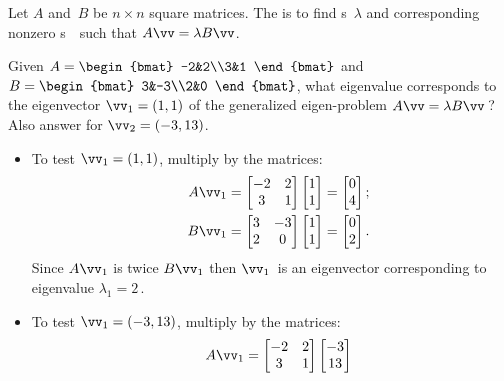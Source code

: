 \begin{reduce}
\begin{definition} \label{def:geneig}
Let \(A\) and~\(B\) be \(n\times n\) square matrices. 
The  is to find  s~\(\lambda\) and corresponding nonzero s~\vv\ such that \(A\vv=\lambda B\vv\).
\end{definition}


\begin{example} 
Given \(A=\begin{bmat} -2&2\\3&1 \end{bmat}\) and \(B=\begin{bmat} 3&-3\\2&0 \end{bmat}\), what eigenvalue corresponds to the eigenvector \(\vv_1=(1,1)\) of the generalized eigen-problem \(A\vv=\lambda B\vv\)\,?  
Also answer for \(\vv_2=(-3,13)\).
\begin{solution} 
\begin{itemize}
\item To test \(\vv_1=(1,1)\), multiply by the matrices:
\begin{eqnarray*}
&&A\vv_1=\begin{bmatrix} -2&2\\3&1 \end{bmatrix}\begin{bmatrix} 1\\1 \end{bmatrix}
=\begin{bmatrix} 0\\4 \end{bmatrix};
\\&&B\vv_1=\begin{bmatrix} 3&-3\\2&0 \end{bmatrix}\begin{bmatrix} 1\\1 \end{bmatrix}
=\begin{bmatrix} 0\\2 \end{bmatrix}.
\end{eqnarray*}
Since \(A\vv_1\) is twice \(B\vv_1\) then \(\vv_1\)~is an eigenvector corresponding to eigenvalue \(\lambda_1=2\)\,.
\item To test \(\vv_1=(-3,13)\), multiply by the matrices:
\begin{eqnarray*}
&&A\vv_1=\begin{bmatrix} -2&2\\3&1 \end{bmatrix}\begin{bmatrix} -3\\13 \end{bmatrix}

\end{eqnarray*}
\end{itemize}
\end{solution}
\end{example}
\end{reduce}
